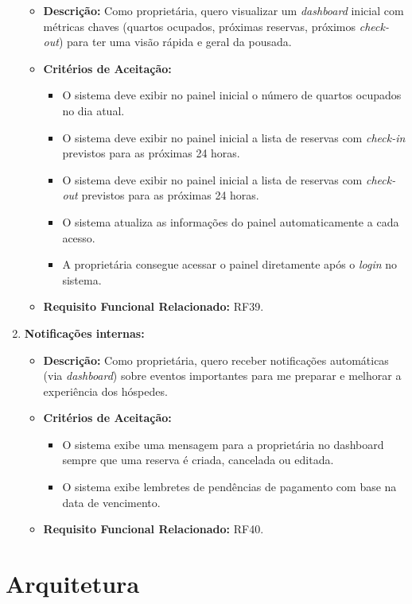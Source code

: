 \documentclass[
	12pt,				%
	openany,			%
	twoside,			%
	a4paper,			%
	english,			%
	french,				%
	spanish,			%
	brazil				%
	]{abntex2}
\begin{document}
\begin{enumerate}[label=\textbf{\arabic*.}]
\begin{itemize}
	 	\item \textbf{Descrição:} Como proprietária, quero visualizar um \textit{dashboard} inicial com métricas chaves (quartos ocupados, próximas reservas, próximos \textit{check-out}) para ter uma visão rápida e geral da pousada.
	 	\item \textbf{Critérios de Aceitação:}
	 	\begin{itemize}
	 		\item O sistema deve exibir no painel inicial o número de quartos ocupados no dia atual.
	 		\item O sistema deve exibir no painel inicial a lista de reservas com \textit{check-in} previstos para as próximas 24 horas.
	 		\item O sistema deve exibir no painel inicial a lista de reservas com \textit{check-out} previstos para as próximas 24 horas.
	 		\item O sistema atualiza as informações do painel automaticamente a cada acesso.
	 		\item A proprietária consegue acessar o painel diretamente após o \textit{login} no sistema.
	 	\end{itemize}
	 	\item \textbf{Requisito Funcional Relacionado:} RF39.
	 \end{itemize} 
	  \item \textbf{Notificações internas:}
	 \begin{itemize}
	 	\item \textbf{Descrição:} Como proprietária, quero receber notificações automáticas (via \textit{dashboard}) sobre eventos importantes para me preparar e melhorar a experiência dos hóspedes.
	 	\item \textbf{Critérios de Aceitação:}
	 	\begin{itemize}
	 		\item O sistema exibe uma mensagem para a proprietária no dashboard sempre que uma reserva é criada, cancelada ou editada.
	 		\item O sistema exibe lembretes de pendências de pagamento com base na data de vencimento.
	 	\end{itemize}
	 	\item \textbf{Requisito Funcional Relacionado:} RF40.
	 \end{itemize} 
		\end{enumerate}
\section{Arquitetura}
\end{document}
